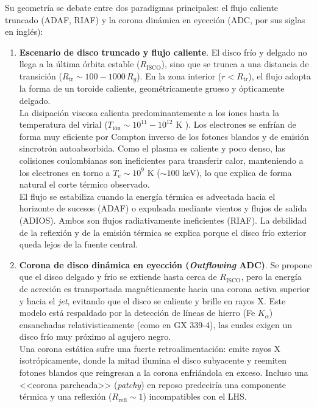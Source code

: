 \begin{itemize}
\begin{enumerate}
    \end{enumerate}
    Su geometría se debate entre dos paradigmas principales: el flujo caliente truncado (ADAF, RIAF) y la corona dinámica en eyección (ADC, por sus siglas en inglés):
    \begin{enumerate}
        \item \textbf{Escenario de disco truncado y flujo caliente}. El disco frío y delgado no llega a la última órbita estable ($R_{\mbox{ISCO}}$), sino que se trunca a una distancia de transición ($R_{\mbox{tr}} \sim 100 - 1000\, R_g$). En la zona interior ($r < R_{\mbox{tr}}$), el flujo adopta la forma de un toroide caliente, geométricamente grueso y ópticamente delgado. \\
        La disipación viscosa calienta predominantemente a los iones hasta la temperatura del virial ($T_{\mbox{ión}} \sim 10^{11} - 10^{12}$ K \cite{mornas2026bloque2}). Los electrones se enfrían de forma muy eficiente por Compton inverso de los fotones blandos y de emisión sincrotrón autoabsorbida. Como el plasma es caliente y poco denso, las colisiones coulombianas son ineficientes para transferir calor, manteniendo a los electrones en torno a $T_e \sim 10^9$ K ($\sim 100$ keV), lo que explica de forma natural el corte térmico observado. \\
        El flujo se estabiliza cuando la energía térmica es advectada hacia el horizonte de sucesos (ADAF) o expulsada mediante vientos y flujos de salida (ADIOS). Ambos son flujos radiativamente ineficientes (RIAF). La debilidad de la reflexión y de la emisión térmica se explica porque el disco frío exterior queda lejos de la fuente central.
        \item \textbf{Corona de disco dinámica en eyección (\textit{Outflowing} ADC)}. Se propone que el disco delgado y frío se extiende hasta cerca de $R_{\mbox{ISCO}}$, pero la energía de acreción es transportada magnéticamente hacia una corona activa superior y hacia el \textit{jet}, evitando que el disco se caliente y brille en rayos X. Este modelo está respaldado por la detección de líneas de hierro (Fe $K_\alpha$) ensanchadas relativisticamente (como en GX 339-4), las cuales exigen un disco frío muy próximo al agujero negro. \\
        Una corona estática sufre una fuerte retroalimentación: emite rayos X isotrópicamente, donde la mitad ilumina el disco subyacente y reemiten fotones blandos que reingresan a la corona enfriándola en exceso. Incluso una <<corona parcheada>> (\textit{patchy}) en reposo predeciría una componente térmica y una reflexión ($R_{\mbox{refl}} \sim 1$) incompatibles con el LHS.

\end{enumerate}
\end{itemize}
